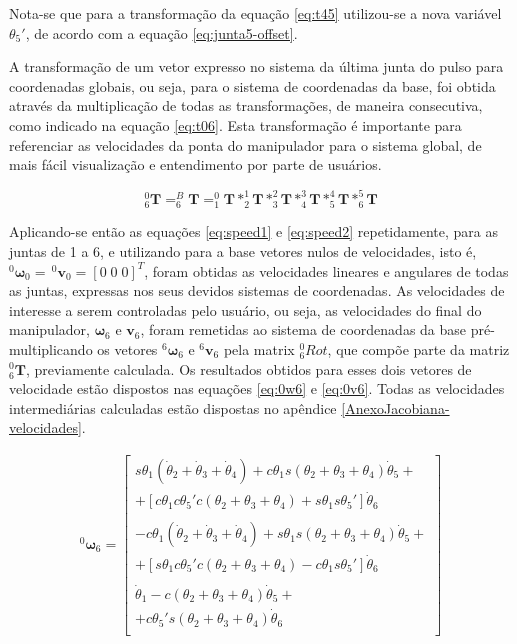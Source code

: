 Nota-se que para a transformação da equação \ref{eq:t45} utilizou-se a nova variável
$\theta_5'$, de acordo com a equação \ref{eq:junta5-offset}.

A transformação de um vetor expresso no sistema da última junta do pulso para coordenadas
globais, ou seja, para o sistema de coordenadas da base, foi obtida através 
da multiplicação de todas as transformações, de maneira consecutiva, como indicado na
equação \ref{eq:t06}.
Esta transformação é importante para referenciar as velocidades
da ponta do manipulador para o sistema global, de mais fácil visualização e entendimento
por parte de usuários.

\begin{equation}
    \label{eq:t06}
    ^0_6\textbf{T} = ^B_6\textbf{T} = ^0_1\textbf{T}*^1_2\textbf{T}*^2_3\textbf{T}*^3_4\textbf{T}*^4_5\textbf{T}*^5_6\textbf{T}
\end{equation}

Aplicando-se então as equações \ref{eq:speed1} e \ref{eq:speed2} repetidamente, para as juntas de 1 a 6, e utilizando para a 
base vetores nulos de velocidades, isto é, $^0\boldsymbol{\omega}_0 = \, ^0\textbf{v}_0 = \left[0 \; 0 \; 0 \right]^T$,
foram obtidas as velocidades lineares e angulares de todas as juntas, expressas nos seus devidos 
sistemas de coordenadas. As velocidades de interesse a serem controladas pelo usuário, ou seja,
as velocidades do final do manipulador, $\boldsymbol{\omega}_6$ e $\textbf{v}_6$, foram remetidas ao sistema de 
coordenadas da base pré-multiplicando os vetores $^6\boldsymbol{\omega}_6$ e $^6\textbf{v}_6$ pela matrix $^0_6Rot$,
que compõe parte da matriz $^0_6\textbf{T}$, previamente calculada.
Os resultados obtidos para esses dois vetores de velocidade estão dispostos nas equações 
\ref{eq:0w6} e \ref{eq:0v6}. Todas as velocidades intermediárias calculadas estão dispostas no apêndice \ref{AnexoJacobiana-velocidades}.

\begin{equation}
    \label{eq:0w6}
\begin{gathered}
    ^0\boldsymbol{\omega}_6 = \begin{bmatrix}
        s\theta_1(\dot{\theta}_2 + \dot{\theta}_3 + \dot{\theta}_4) + c\theta_1s(\theta_2+\theta_3+\theta_4)\dot{\theta}_5 + \\
        + [c\theta_1c\theta_5'c(\theta_2+\theta_3+\theta_4) +s\theta_1s\theta_5']\dot{\theta}_6\\
        \\
        -c\theta_1(\dot{\theta}_2+\dot{\theta}_3+\dot{\theta}_4) + s\theta_1s(\theta_2+\theta_3+\theta_4)\dot{\theta}_5 + \\
        +[s\theta_1c\theta_5'c(\theta_2+\theta_3+\theta_4) -c\theta_1s\theta_5']\dot{\theta}_6 \\
        \\
        \dot{\theta}_1 -c(\theta_2+\theta_3+\theta_4)\dot{\theta}_5 + \\
        +c\theta_5's(\theta_2+\theta_3+\theta_4)\dot{\theta}_6 \\   
    \end{bmatrix}
\end{gathered}
\end{equation}

